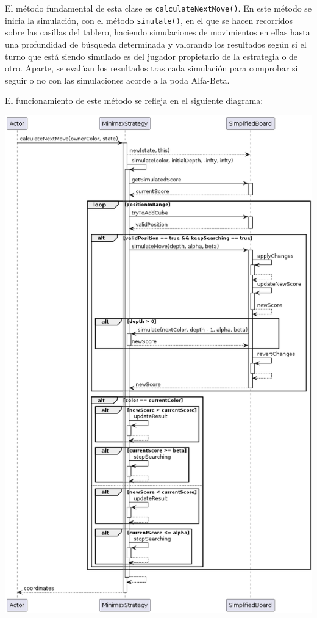 \documentclass[../DocumentoOficial.tex]{subfiles}
\begin{document}
El método fundamental de esta clase es \texttt{calculateNextMove()}. En este método se inicia la simulación, con el método \texttt{simulate()}, en el que se hacen recorridos sobre las casillas del tablero, haciendo simulaciones de movimientos en ellas hasta una profundidad de búsqueda determinada y valorando los resultados según si el turno que está siendo simulado es del jugador propietario de la estrategia o de otro. Aparte, se evalúan los resultados tras cada simulación para comprobar si seguir o no con las simulaciones acorde a la poda Alfa-Beta.

El funcionamiento de este método se refleja en el siguiente diagrama:

\begin{center}
\includegraphics[scale=0.5]{MinimaxStrategy.calculateNextMove()-sprint6.png} 
\end{center}
\end{document}
